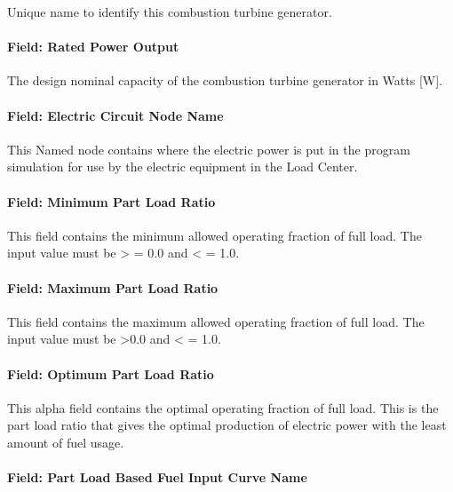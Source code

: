 Unique name to identify this combustion turbine generator.

\paragraph{Field: Rated Power Output}\label{field-rated-power-output-1}

The design nominal capacity of the combustion turbine generator in Watts {[}W{]}.

\paragraph{Field: Electric Circuit Node Name}\label{field-electric-circuit-node-name-1}

This Named node contains where the electric power is put in the program simulation for use by the electric equipment in the Load Center.

\paragraph{Field: Minimum Part Load Ratio}\label{field-minimum-part-load-ratio-1}

This field contains the minimum allowed operating fraction of full load. The input value must be \textgreater{} = 0.0 and \textless{} = 1.0.

\paragraph{Field: Maximum Part Load Ratio}\label{field-maximum-part-load-ratio-1}

This field contains the maximum allowed operating fraction of full load. The input value must be \textgreater{}0.0 and \textless{} = 1.0.

\paragraph{Field: Optimum Part Load Ratio}\label{field-optimum-part-load-ratio-1}

This alpha field contains the optimal operating fraction of full load. This is the part load ratio that gives the optimal production of electric power with the least amount of fuel usage.

\paragraph{Field: Part Load Based Fuel Input Curve Name}\label{field-part-load-based-fuel-input-curve-name}

